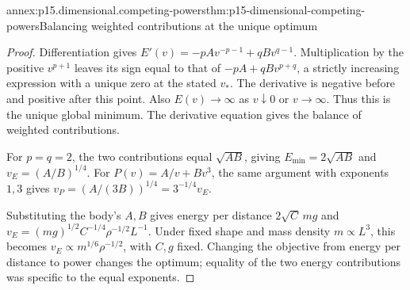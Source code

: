 \begin{annexitem}{annex:p15.dimensional.competing-powers}{thm:p15-dimensional-competing-powers}{Balancing weighted contributions at the unique optimum}
\begin{proof}
Differentiation gives
\(E'(v)=-pAv^{-p-1}+qBv^{q-1}\).
Multiplication by the positive \(v^{p+1}\) leaves its sign equal to
that of \(-pA+qBv^{p+q}\), a strictly increasing expression with a
unique zero at the stated \(v_*\).
The derivative is negative before and positive after this point.
Also \(E(v)\to\infty\) as \(v\downarrow0\) or \(v\to\infty\).
Thus this is the unique global minimum.
The derivative equation gives the balance of weighted contributions.

For \(p=q=2\), the two contributions equal \(\sqrt{AB}\), giving
\(E_{\min}=2\sqrt{AB}\) and \(v_E=(A/B)^{1/4}\).
For \(P(v)=A/v+Bv^3\), the same argument with exponents \(1,3\)
gives \(v_P=(A/(3B))^{1/4}=3^{-1/4}v_E\).

Substituting the body's \(A,B\) gives energy per distance
\(2\sqrt C\,mg\) and
\(v_E=(mg)^{1/2}C^{-1/4}\rho^{-1/2}L^{-1}\).
Under fixed shape and mass density \(m\propto L^3\), this becomes
\(v_E\propto m^{1/6}\rho^{-1/2}\), with \(C,g\) fixed.
Changing the objective from energy per distance to power changes the
optimum; equality of the two energy contributions was specific to
the equal exponents.
\end{proof}
\end{annexitem}


